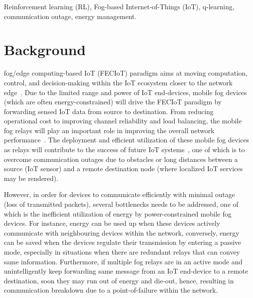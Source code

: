 \documentclass[journal]{IEEEtran}
\begin{document}
\begin{IEEEkeywords}
Reinforcement learning (RL), Fog-based Internet-of-Things (IoT), q-learning, communication outage, energy management.
\end{IEEEkeywords}


%
\IEEEpeerreviewmaketitle

\section{Background}
 fog/edge computing-based IoT (FECIoT) paradigm aims at moving computation, control, and decision-making within the IoT ecosystem closer to the network edge~\cite{Omoniwa2018}. Due to the limited range and power of IoT end-devices, mobile fog devices (which are often energy-constrained) will drive the FECIoT paradigm by forwarding sensed IoT data from source to destination. From reducing operational cost to improving channel reliability and load balancing, the mobile fog relays will play an important role in improving the overall network performance~\cite{BenMimoune2017}. The deployment and efficient utilization of these mobile fog devices as relays will contribute to the success of future IoT systems~\cite{Chiangh2016}, one of which is to overcome communication outages due to obstacles or long distances between a source (IoT sensor) and a remote destination node (where localized IoT services may be rendered).

However, in order for devices to communicate efficiently with minimal outage (loss of transmitted packets), several bottlenecks needs to be addressed, one of which is the inefficient utilization of energy by power-constrained mobile fog devices. For instance, energy can be used up when these devices actively communicate with neighbouring devices within the network, conversely, energy can be saved when the devices regulate their transmission by entering a passive mode, especially in situations when there are redundant relays that can convey same information. Furthermore, if multiple fog relays are in an active mode and unintelligently keep forwarding same message from an IoT end-device to a remote destination, soon they may run out of energy and die-out, hence, resulting in communication breakdown due to a point-of-failure within the network.
\end{document}

